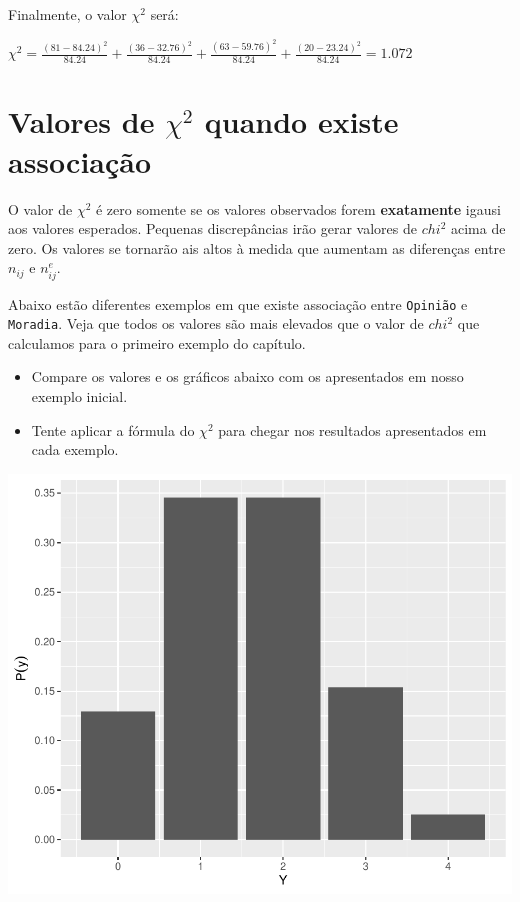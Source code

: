 \documentclass[
]{book}
\begin{document}
Finalmente, o valor \(\chi^2\) será:

\(\chi^2 = \frac{(81 - 84.24)^2}{84.24} + \frac{(36 - 32.76)^2}{84.24} + \frac{(63 - 59.76)^2}{84.24} + \frac{(20 - 23.24)^2}{84.24} = 1.072\)

\hypertarget{valores-de-chi2-quando-existe-associauxe7uxe3o}{%
\section{\texorpdfstring{Valores de \(\chi^2\) quando existe associação}{Valores de \textbackslash chi\^{}2 quando existe associação}}\label{valores-de-chi2-quando-existe-associauxe7uxe3o}}

O valor de \(\chi^2\) é zero somente se os valores observados forem \textbf{exatamente} igausi aos valores esperados. Pequenas discrepâncias irão gerar valores de \(chi^2\) acima de zero. Os valores se tornarão ais altos à medida que aumentam as diferenças entre \(n_{ij}\) e \(n_{ij}^e\).

Abaixo estão diferentes exemplos em que existe associação entre \texttt{Opinião} e \texttt{Moradia}. Veja que todos os valores são mais elevados que o valor de \(chi^2\) que calculamos para o primeiro exemplo do capítulo.

\begin{itemize}
\item
  Compare os valores e os gráficos abaixo com os apresentados em nosso exemplo inicial.
\item
  Tente aplicar a fórmula do \(\chi^2\) para chegar nos resultados apresentados em cada exemplo.
\end{itemize}

\begin{flushleft}\includegraphics{probest-cambientais_files/figure-latex/unnamed-chunk-196-1} \end{flushleft}
\end{document}
